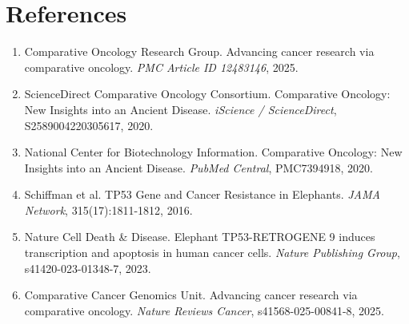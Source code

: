 \documentclass[12pt]{article}
\begin{document}
\section*{References}

\begin{enumerate}
    \item Comparative Oncology Research Group. Advancing cancer research via comparative oncology. \textit{PMC Article ID 12483146}, 2025.
    \item ScienceDirect Comparative Oncology Consortium. Comparative Oncology: New Insights into an Ancient Disease. \textit{iScience / ScienceDirect}, S2589004220305617, 2020.
    \item National Center for Biotechnology Information. Comparative Oncology: New Insights into an Ancient Disease. \textit{PubMed Central}, PMC7394918, 2020.
    \item Schiffman et al. TP53 Gene and Cancer Resistance in Elephants. \textit{JAMA Network}, 315(17):1811-1812, 2016.
    \item Nature Cell Death \& Disease. Elephant TP53-RETROGENE 9 induces transcription and apoptosis in human cancer cells. \textit{Nature Publishing Group}, s41420-023-01348-7, 2023.
    \item Comparative Cancer Genomics Unit. Advancing cancer research via comparative oncology. \textit{Nature Reviews Cancer}, s41568-025-00841-8, 2025.
\end{enumerate}
\end{document}
